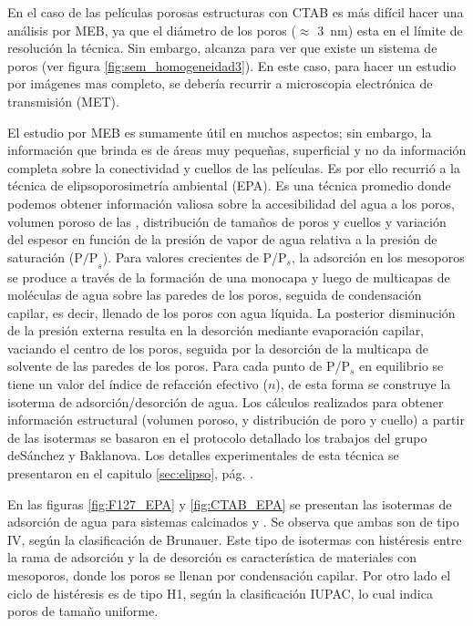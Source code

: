 		 En el caso de las películas porosas estructuras con CTAB es más difícil hacer una análisis por MEB, ya que el diámetro de los poros ($\approx$ \SI{3}{\nm}) esta en el límite de resolución la técnica. Sin embargo, alcanza para  ver que existe un sistema de poros (ver figura \ref{fig:sem_homogeneidad3}). En este caso, para hacer un estudio por imágenes mas completo, se debería recurrir a microscopia electrónica de transmisión (MET).

		 El estudio por MEB es sumamente útil en muchos aspectos; sin embargo, la información que brinda es de áreas muy pequeñas, superficial y no da información completa sobre la conectividad y cuellos de las películas. Es por ello recurrió a la técnica de elipsoporosimetría ambiental (EPA). Es una técnica promedio donde podemos obtener información valiosa sobre la accesibilidad del agua a los poros, volumen poroso de las \pdm, distribución de tamaños de poros y cuellos y variación del espesor en función de la presión de vapor de agua relativa a la presión de saturación ($\text{P/P}_s$). Para valores crecientes de P/P$_s$, la adsorción en los mesoporos se produce a través de la formación de una monocapa y luego de multicapas de moléculas de agua sobre las paredes de los poros, seguida de condensación capilar, es decir, llenado de los poros con agua líquida. La posterior disminución de la presión externa resulta en la desorción mediante evaporación capilar, vaciando el centro de los poros, seguida por la desorción de la multicapa de solvente de las paredes de los poros. Para cada punto de P/P$_s$ en equilibrio se tiene un valor del índice de refacción efectivo ($n$), de esta forma se construye la isoterma de adsorción/desorción de agua. Los cálculos realizados para obtener información estructural (volumen poroso, y distribución de poro y cuello) a partir de las isotermas se basaron en el protocolo detallado los trabajos del grupo deSánchez y Baklanova\cite{Baklanov2000,Boissiere2005,Sakatani2006}. Los detalles experimentales de esta técnica se presentaron en el capitulo \ref{sec:elipso}, pág. \pageref{sec:elipso}.

		 En las figuras \ref{fig:F127_EPA} y \ref{fig:CTAB_EPA} se presentan las isotermas de adsorción de agua para sistemas calcinados \pdmF\space y \pdmC. Se observa que ambas son de tipo IV, según la clasificación de Brunauer\cite{Gregg1967,Violi2015,Fuertes2010}. Este tipo de isotermas con histéresis entre la rama de adsorción y la de desorción es característica de materiales con mesoporos, donde los poros se llenan por condensación capilar. Por otro lado el ciclo de histéresis es de tipo H1, según la clasificación IUPAC, lo cual indica poros de tamaño uniforme.\cite{Gregg1967,Lowell2004,Sing1985}

